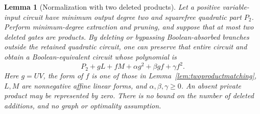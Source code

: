 \documentclass[11pt]{article}
\newtheorem{lemma}[theorem]{Lemma}
\theoremstyle{definition}
\theoremstyle{remark}
\begin{document}
\begin{lemma}[Normalization with two deleted products]\label{lem:twoproductnormal}
Let a positive variable-input circuit have minimum output degree two and squarefree quadratic part $P_2$. Perform minimum-degree extraction and pruning, and suppose that at most two deleted gates are products. By deleting or bypassing Boolean-absorbed branches outside the retained quadratic circuit, one can preserve that entire circuit and obtain a Boolean-equivalent circuit whose polynomial is
\[
 P_2+gL+fM+\alpha g^2+\beta gf+\gamma f^2.
\]
Here $g=UV$, the form of $f$ is one of those in Lemma~\ref{lem:twoproductmatching}, $L,M$ are nonnegative affine linear forms, and $\alpha,\beta,\gamma\ge0$. An absent private product may be represented by zero. There is no bound on the number of deleted additions, and no graph or optimality assumption.
\end{lemma}
\end{document}
